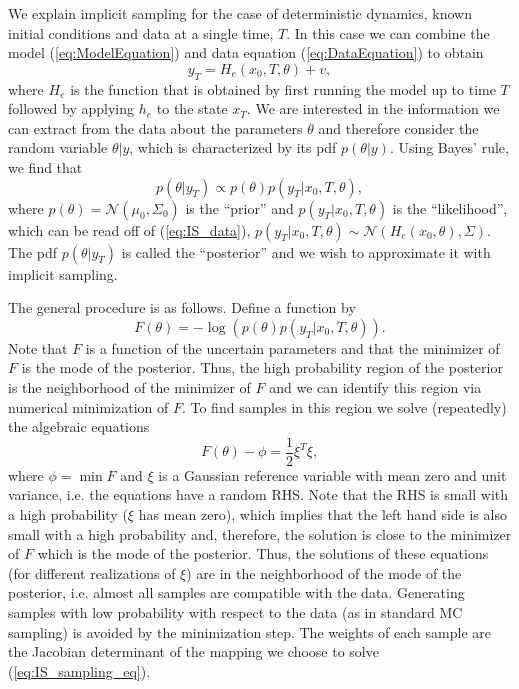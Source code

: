 \documentclass[11pt]{article}
\begin{document}
We explain implicit sampling for the case of deterministic dynamics, known initial conditions and 
data at a single time, $T$.
In this case we can combine the model (\ref{eq:ModelEquation}) and data equation (\ref{eq:DataEquation}) to obtain
\begin{equation}
\label{eq:IS_data}
	y_T = H_e(x_0,T,\theta)+v,
\end{equation}
where $H_e$ is the function that is obtained by first running the model up
to time $T$ followed by applying $h_e$ to the state $x_T$. We are interested in the information we can extract from the data about the parameters $\theta$ and
therefore consider the random variable $\theta|y$, which is characterized by its pdf $p(\theta|y)$. Using Bayes' rule, we find that
\begin{equation}
\label{eq:post}
	p(\theta|y_T) \propto p(\theta)p(y_T|x_0,T,\theta),
\end{equation}
where  $p(\theta) = \mathcal{N}(\mu_0,\Sigma_0)$ is the ``prior'' and $p(y_T|x_0,T,\theta)$ is the ``likelihood'',
which can be read off of (\ref{eq:IS_data}), $p(y_T|x_0,T,\theta)\sim \mathcal{N}(H_e(x_0,\theta),\Sigma)$.
The pdf $p(\theta|y_T)$  is called the ``posterior'' and we wish to approximate it with implicit sampling. 

The general procedure is as follows. Define a function by
\begin{equation}
	F(\theta)= -\log \left(p(\theta)p(y_T|x_0,T,\theta)\right).
\end{equation}
Note that $F$ is a function of the uncertain parameters and that the minimizer of $F$ is the mode of the posterior. Thus, the high probability region of the posterior is the neighborhood of the minimizer of $F$ and we can identify this region via numerical minimization of $F$. To find samples in this region we solve (repeatedly) the algebraic equations
\begin{equation}
\label{eq:IS_sampling_eq}
	F(\theta)-\phi = \frac{1}{2}\xi^T\xi,
\end{equation}
where $\phi = \min F$ and $\xi$ is a Gaussian reference variable with mean zero and unit variance, i.e. the equations have a random RHS.
Note that the RHS is small with a high probability ($\xi$ has mean zero), which implies that the left hand side is also small with a high probability and, therefore, the solution is close to the minimizer of $F$ which is the mode of the posterior.
Thus, the solutions of these equations (for different realizations of $\xi$) are in the neighborhood of the mode of the posterior, i.e. almost all samples are compatible with the data.
Generating samples with low probability with respect to the data (as in standard MC sampling) is avoided by the minimization step. The weights of each sample are the Jacobian determinant of the mapping we choose to solve (\ref{eq:IS_sampling_eq}).
\end{document}
